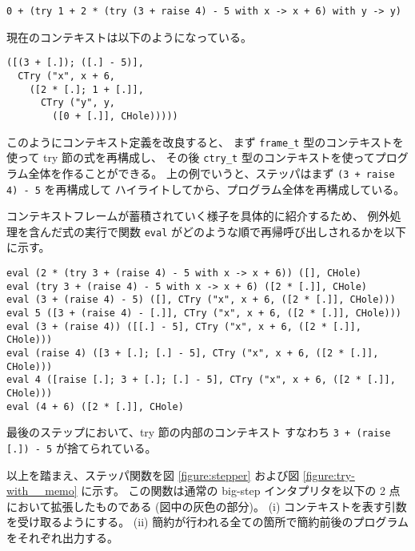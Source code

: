 \begin{verbatim}
0 + (try 1 + 2 * (try (3 + raise 4) - 5 with x -> x + 6) with y -> y)
\end{verbatim}
\noindent 現在のコンテキストは以下のようになっている。
\begin{verbatim}
([(3 + [.]); ([.] - 5)],
  CTry ("x", x + 6,
    ([2 * [.]; 1 + [.]],
      CTry ("y", y,
        ([0 + [.]], CHole)))))
\end{verbatim}

このようにコンテキスト定義を改良すると、
まず \texttt{frame\_t} 型のコンテキストを使って try 節の式を再構成し、
その後 \texttt{ctry\_t} 型のコンテキストを使ってプログラム全体を作ることができる。
上の例でいうと、ステッパはまず \texttt{(3 + raise 4) - 5} を再構成して
ハイライトしてから、プログラム全体を再構成している。

コンテキストフレームが蓄積されていく様子を具体的に紹介するため、
例外処理を含んだ式の実行で関数 \texttt{eval} がどのような順で再帰呼び出しされるかを以下に示す。

\begin{verbatim}
eval (2 * (try 3 + (raise 4) - 5 with x -> x + 6)) ([], CHole)
eval (try 3 + (raise 4) - 5 with x -> x + 6) ([2 * [.]], CHole)
eval (3 + (raise 4) - 5) ([], CTry ("x", x + 6, ([2 * [.]], CHole)))
eval 5 ([3 + (raise 4) - [.]], CTry ("x", x + 6, ([2 * [.]], CHole)))
eval (3 + (raise 4)) ([[.] - 5], CTry ("x", x + 6, ([2 * [.]], CHole)))
eval (raise 4) ([3 + [.]; [.] - 5], CTry ("x", x + 6, ([2 * [.]], CHole)))
eval 4 ([raise [.]; 3 + [.]; [.] - 5], CTry ("x", x + 6, ([2 * [.]], CHole)))
eval (4 + 6) ([2 * [.]], CHole)
\end{verbatim}

\noindent 最後のステップにおいて、try 節の内部のコンテキスト
すなわち \texttt{3 + (raise [.])\ - 5} が捨てられている。

以上を踏まえ、ステッパ関数を図 \ref{figure:stepper} および図 \ref{figure:try-with__memo} に示す。
この関数は通常の big-step インタプリタを以下の 2 点において拡張したものである (図中の灰色の部分)。
(i) コンテキストを表す引数を受け取るようにする。
(ii) 簡約が行われる全ての箇所で簡約前後のプログラムをそれぞれ出力する。

